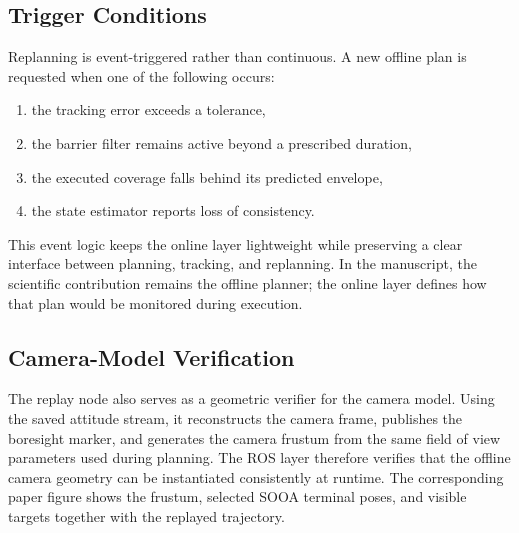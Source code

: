 \subsection{Trigger Conditions}

Replanning is event-triggered rather than continuous. A new offline plan is
requested when one of the following occurs:
\begin{enumerate}
  \item the tracking error exceeds a tolerance,
  \item the barrier filter remains active beyond a prescribed duration,
  \item the executed coverage falls behind its predicted envelope,
  \item the state estimator reports loss of consistency.
\end{enumerate}
This event logic keeps the online layer lightweight while preserving a clear interface
between planning, tracking, and replanning. In the manuscript, the scientific
contribution remains the offline planner; the online layer defines how that
plan would be monitored during execution.

\subsection{Camera-Model Verification}

The replay node also serves as a geometric verifier for the camera model.
Using the saved attitude stream, it reconstructs the camera frame, publishes
the boresight marker, and generates the camera frustum from the same field of
view parameters used during planning. The ROS layer therefore verifies that
the offline camera geometry can be instantiated consistently at runtime.
The corresponding paper figure shows the frustum, selected SOOA terminal
poses, and visible targets together with the replayed trajectory.
